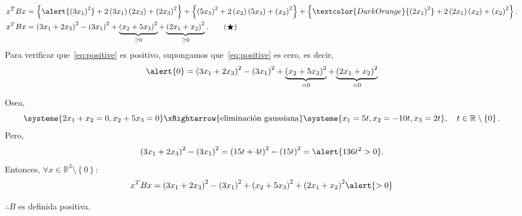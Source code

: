 \begin{frame}
\begin{solution}
\begin{align*}
			x^{T}Bx & =
			\left\{
			{\alert{\left(3x_{1}\right)^{2}}}+
			2\left(3x_{1}\right)\left(2x_{3}\right)+
			{\left(2x_{3}\right)}^{2}
			\right\}+
			\left\{
			{\left(5x_{3}\right)}^{2}+
			2\left(x_{2}\right)\left(5x_{3}\right)+
			{\left(x_{2}\right)}^{2}
			\right\}+
			\left\{
			\textcolor{DarkOrange}{{\left(2x_{1}\right)}^{2}}+
			2\left(2x_{1}\right)\left(x_{2}\right)+
			{\left(x_{2}\right)}^{2}
			\right\}.           \\
			x^{T}Bx & =
			{\left(3x_{1}+2x_{3}\right)}^{2}-{\left(3x_{1}\right)}^{2}+
			\underbrace{{\left(x_{2}+5x_{3}\right)}^{2}}_{\geq0}+
			\underbrace{{\left(2x_{1}+x_{2}\right)}^{2}}_{\geq0}.
			\label{eq:positive}\tag{$\bigstar$}
		\end{align*}
		Para verificar que~\eqref{eq:positive} es positivo, supongamos
		que~\eqref{eq:positive} es \alert{cero}, es decir,
		\begin{equation*}
			\alert{0}=
			{\left(3x_{1}+2x_{3}\right)}^{2}-{\left(3x_{1}\right)}^{2}+
			\underbrace{{\left(x_{2}+5x_{3}\right)}^{2}}_{=0}+
			\underbrace{{\left(2x_{1}+x_{2}\right)}^{2}}_{=0}
		\end{equation*}
	\end{solution}
\end{frame}

\begin{frame}
	Osea,
	\begin{equation*}
		\systeme{
		2x_{1}+x_{2}=0,
		x_{2}+5x_{3}=0
		}
		\xRightarrow{\text{eliminación gaussiana}}
		\systeme{
			x_{1}=5t,
			x_{2}=-10t,
			x_{3}=2t
		},\quad
		t\in\mathbb{R}\setminus\left\{0\right\}.
	\end{equation*}
	Pero,
	\begin{equation*}
		{\left(3x_{1}+2x_{3}\right)}^{2}-{\left(3x_{1}\right)}^{2}=
			{\left(15t+4t\right)}^{2}-{\left(15t\right)}^{2}=
		\alert{136t^{2}>0}.
	\end{equation*}
	Entonces, $\forall x\in\mathbb{R}^3\setminus\left\{0\right\}$:
	\begin{equation*}
		x^{T}Bx =
			{\left(3x_{1}+2x_{3}\right)}^{2}-{\left(3x_{1}\right)}^{2}+
		{\left(x_{2}+5x_{3}\right)}^{2}+
		{\left(2x_{1}+x_{2}\right)}^{2}
		\alert{>0}
	\end{equation*}

	$\therefore B$ es definida positiva.
\end{frame}

